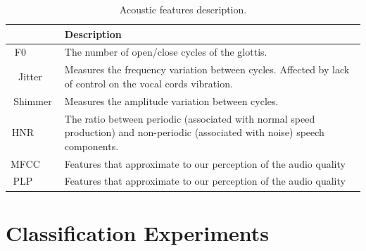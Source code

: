 \pagebreak

\begin{table}[!htb]
	\renewcommand{\arraystretch}{1.4} %
	\centering
	\begin{tabular}{cL}
		\hline
		~ & \textbf{Description} \\ \hline
		F0      & The number of open/close cycles of the glottis. \\ 
		Jitter  & Measures the frequency variation between cycles. Affected by lack of control on the vocal cords vibration. \\ 
		Shimmer & Measures the amplitude variation between cycles. \\ 
		HNR     & The ratio between periodic (associated with normal speed production) and non-periodic (associated with noise) speech components. \\ 
		MFCC    & Features that approximate to our perception of the audio quality \\ 
		PLP     & Features that approximate to our perception of the audio quality \\
		\hline
	\end{tabular}
	\caption[Acoustic features description.]{Acoustic features description.}
	\label{featureDescription}
\end{table}

\section{Classification Experiments}

